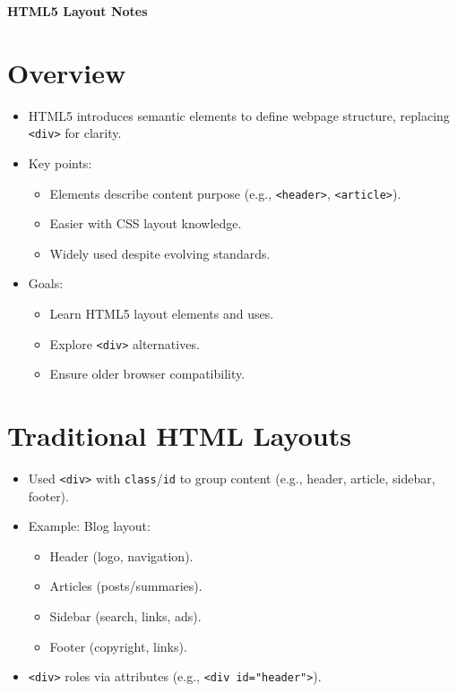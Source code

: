 \documentclass[a4paper,11pt]{article}
\newcommand{\code}[1]{\texttt{#1}}
\begin{document}
\begin{center}
    {\sffamily\LARGE\bfseries HTML5 Layout Notes}
    \vspace{0.5em}
\end{center}

\section{Overview}
\begin{itemize}
    \item HTML5 introduces semantic elements to define webpage structure, replacing \code{<div>} for clarity.
    \item Key points:
    \begin{itemize}
        \item Elements describe content purpose (e.g., \code{<header>}, \code{<article>}).
        \item Easier with CSS layout knowledge.
        \item Widely used despite evolving standards.
    \end{itemize}
    \item Goals:
    \begin{itemize}
        \item Learn HTML5 layout elements and uses.
        \item Explore \code{<div>} alternatives.
        \item Ensure older browser compatibility.
    \end{itemize}
\end{itemize}

\section{Traditional HTML Layouts}
\begin{itemize}
    \item Used \code{<div>} with \code{class}/\code{id} to group content (e.g., header, article, sidebar, footer).
    \item Example: Blog layout:
    \begin{itemize}
        \item Header (logo, navigation).
        \item Articles (posts/summaries).
        \item Sidebar (search, links, ads).
        \item Footer (copyright, links).
    \end{itemize}
    \item \code{<div>} roles via attributes (e.g., \code{<div id="header">}).
\end{itemize}
\end{document}
